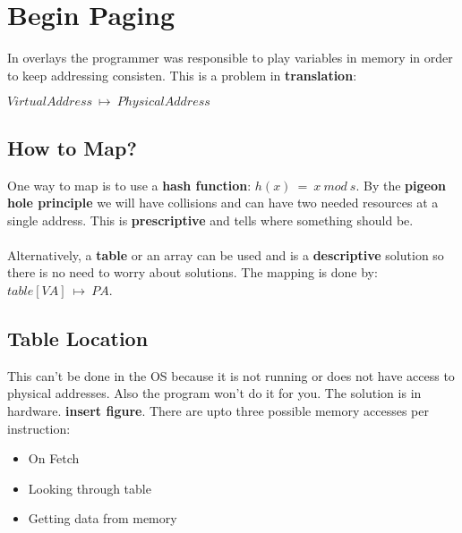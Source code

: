 \documentclass[../base_file/cs1550_notes.tex]{subfiles}
\begin{document}
\section{Begin Paging}
In overlays the programmer was responsible to play variables in memory in order to keep addressing
consisten.  This is a problem in \textbf{translation}:
\begin{center}
$Virtual Address\ \longmapsto\ Physical Address$
\end{center}
\subsection{How to Map?}
One way to map is to use a \textbf{hash function}: $h(x)\ =\ x\ mod\ s$.  By the \textbf{pigeon hole
principle} we will have collisions and can have two needed resources at a single address. This is 
\textbf{prescriptive} and tells where something should be.\\\\
Alternatively, a \textbf{table} or an array can be used and is a \textbf{descriptive} solution 
so there is no need to worry about solutions.  The mapping is done by: $table[VA]\ \longmapsto\ PA$.
\subsection{Table Location}
This can't be done in the OS because  it is not running or does not have access to physical addresses.
Also the program won't do it for you.  The solution is in hardware. \textbf{insert figure}.  There are
upto three possible memory accesses per instruction:
\begin{itemize}
	\item On Fetch
	\item Looking through table
	\item Getting data from memory
\end{itemize}
\end{document}
